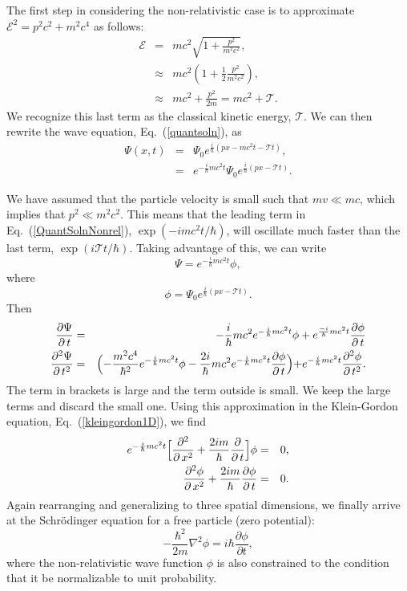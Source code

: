 \documentclass[preprint,footinbib,preprintnumbers,amsmath,amssymb,prb,12pt]{revtex4}
\begin{document}
The first step in considering the non-relativistic case is to
approximate $\mathcal{E}^2=p^2c^2+m^2c^4$ as follows:
\begin{eqnarray}
\mathcal{E}&=&mc^2\sqrt{1+\frac{p^2}{m^2c^2}}\label{emc},\\
&\approx&mc^2\left(1+\frac{1}{2}\frac{p^2}{m^2c^2}\right),\\
&\approx&mc^2+\frac{p^2}{2m}=mc^2+\mathcal{T}.
\end{eqnarray}
We recognize this last term as the classical kinetic energy,
$\mathcal{T}$. We can then rewrite the wave equation,
Eq.~(\ref{quantsoln}), as
\begin{eqnarray}
\Psi(x,t)&=&\Psi_0e^{\frac{i}{\hbar}(px-mc^2t-\mathcal{T} t)},\\
&=&e^{-\frac{i}{\hbar}mc^2t}\Psi_0e^{\frac{i}{\hbar}(px-\mathcal{T}t)}.\label{QuantSolnNonrel}
\end{eqnarray}

We have assumed that the particle velocity is small such that $mv\ll
mc$, which implies that $p^2\ll m^2c^2$. This means that the leading term in
Eq.~(\ref{QuantSolnNonrel}), $\exp(-imc^2t/\hbar)$, will oscillate
much faster than the last term, $\exp(i\mathcal{T}t/\hbar)$. Taking
advantage of this, we can write
\begin{equation}
\Psi=e^{-\frac{i}{\hbar}mc^2t}\phi,
\end{equation}
where
\begin{equation}
\phi=\Psi_0e^{\frac{i}{\hbar}(px-\mathcal{T}t)}.
\end{equation}
Then
\begin{eqnarray}
\frac{\partial\Psi}{\partial\,t}&=&-\frac{i}{\hbar}mc^2e^{-\frac{i}{\hbar}mc^2t}\phi+e^{\frac{-i}{\hbar}mc^2t}\frac{\partial\phi}{\partial\,t}\\
\frac{\partial^2\Psi}{\partial\,t^2}&=&\Bigl(-\frac{m^2c^4}{\hbar^2}e^{-\frac{i}{\hbar}mc^2t}\phi-\frac{2i}{\hbar}mc^2e^{-\frac{i}{\hbar}mc^2t}\frac{\partial\phi}{\partial\,t}\Bigl)+e^{-\frac{i}{\hbar}mc^2t}\frac{\partial^2\phi}{\partial\,t^2}.
\end{eqnarray}
The term in brackets is large and the term outside is small. We
keep the large terms and discard the small one. Using this
approximation in the Klein-Gordon equation,
Eq.~(\ref{kleingordon1D}), we find
\begin{eqnarray}
e^{-\frac{i}{\hbar}mc^2t}\Bigl[\frac{\partial^2}{\partial\,x^2}+\frac{2im}{\hbar}\frac{\partial}{\partial\,t}\Bigl]\phi&=&0,\\
\frac{\partial^2\phi}{\partial\,x^2}+\frac{2im}{\hbar}\frac{\partial\phi}{\partial\,t}&=&0.
\end{eqnarray}
Again rearranging and generalizing to three spatial dimensions, we
finally arrive at the Schr\"{o}dinger equation for a free particle
(zero potential):
\begin{equation}
-\frac{\hbar^2}{2m}\nabla^2\phi=i\hbar\frac{\partial\phi}{\partial
t},
\end{equation}
where the non-relativistic wave function $\phi$ is also constrained to the condition that it be normalizable to unit probability.
\end{document}
